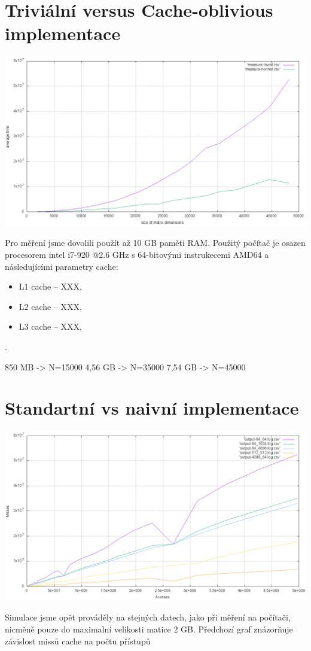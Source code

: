 \documentclass[12pt,a4paper]{report}
\begin{document}
\section{Triviální versus Cache-oblivious implementace}
\includegraphics[width=\textwidth]{./tests/graph1.png}

Pro měření jsme dovolili použít až 10 GB paměti RAM.
Použitý počítač je osazen procesorem intel i7-920 @2.6 GHz
s 64-bitovými instrukecemi AMD64 a následujícími parametry cache:
\begin{itemize}
	\item L1 cache -- XXX,
	\item L2 cache -- XXX,
	\item L3 cache -- XXX,
\end{itemize}.

850 MB  -> N=15000
4,56 GB -> N=35000
7,54 GB -> N=45000




\section{Standartní vs naivní implementace}
\includegraphics[width=\textwidth]{./tests/graph2.png}

Simulace jsme opět prováděly na stejných datech, jako při měření 
na počítači, nicměně pouze do maximalní velikosti matice 2 GB.
Předchozí graf znázorňuje závislost missů cache na počtu přístupů


  
\end{document}
